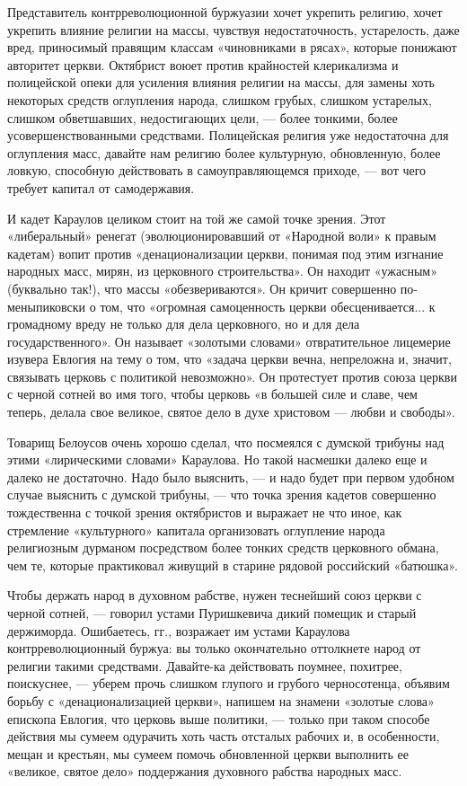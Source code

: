 \documentclass[12pt]{article}
\newcommand{\parnum}{(\arabic{parcount})}
\newcounter{parcount}
\newenvironment{parnumbers}{%
  \par%
  \everypar{\noindent \stepcounter{parcount}\marginpar[]{\parnum}}%
}{}
\begin{document}
\begin{parnumbers}
Представитель контрреволюционной буржуазии хочет укрепить религию, хочет укрепить влияние религии на массы, чувствуя недостаточность, устарелость, даже вред, приносимый правящим классам «чиновниками в рясах», которые понижают авторитет церкви. Октябрист воюет против крайностей клерикализма и полицейской опеки для усиления влияния религии на массы, для замены хоть некоторых средств оглупления народа, слишком грубых, слишком устарелых, слишком обветшавших, недостигающих цели, — более тонкими, более усовершенствованными средствами. Полицейская религия уже недостаточна для оглупления масс, давайте нам религию более культурную, обновленную, более ловкую, способную действовать в самоуправляющемся приходе, — вот чего требует капитал от самодержавия.

И кадет Караулов целиком стоит на той же самой точке зрения. Этот «либеральный» ренегат (эволюционировавший от «Народной воли» к правым кадетам) вопит против «денационализации церкви, понимая под этим изгнание народных масс, мирян, из церковного строительства». Он находит «ужасным» (буквально так!), что массы «обезвериваются». Он кричит совершенно по-меныпиковски о том, что «огромная самоценность церкви обесценивается... к громадному вреду не только для дела церковного, но и для дела государственного». Он называет «золотыми словами» отвратительное лицемерие изувера Евлогия на тему о том, что «задача церкви вечна, непреложна и, значит, связывать церковь с политикой невозможно». Он протестует против союза церкви с черной сотней во имя того, чтобы церковь «в большей силе и славе, чем теперь, делала свое великое, святое дело в духе христовом — любви и свободы».

Товарищ Белоусов очень хорошо сделал, что посмеялся с думской трибуны над этими «лирическими словами» Караулова. Но такой насмешки далеко еще и далеко не достаточно. Надо было выяснить, — и надо будет при первом удобном случае выяснить с думской трибуны, — что точка зрения кадетов совершенно тождественна с точкой зрения октябристов и выражает не что иное, как стремление «культурного» капитала организовать оглупление народа религиозным дурманом посредством более тонких средств церковного обмана, чем те, которые практиковал живущий в старине рядовой российский «батюшка».

Чтобы держать народ в духовном рабстве, нужен теснейший союз церкви с черной сотней, — говорил устами Пуришкевича дикий помещик и старый держиморда. Ошибаетесь, гг., возражает им устами Караулова контрреволюционный буржуа: вы только окончательно оттолкнете народ от религии такими средствами. Давайте-ка действовать поумнее, похитрее, поискуснее, — уберем прочь слишком глупого и грубого черносотенца, объявим борьбу с «денационализацией церкви», напишем на знамени «золотые слова» епископа Евлогия, что церковь выше политики, — только при таком способе действия мы сумеем одурачить хоть часть отсталых рабочих и, в особенности, мещан и крестьян, мы сумеем помочь обновленной церкви выполнить ее «великое, святое дело» поддержания духовного рабства народных масс.


\end{parnumbers}
\end{document}
